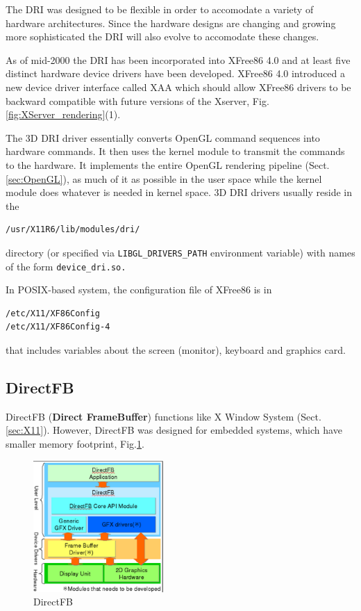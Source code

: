 The DRI was designed to be flexible in order to accomodate a variety of hardware
architectures. Since the hardware designs are changing and growing more
sophisticated the DRI will also evolve to accomodate these changes.

As of mid-2000 the DRI has been incorporated into XFree86 4.0 and at least five
distinct hardware device drivers have been developed. XFree86 4.0 introduced a
new device driver interface called XAA which should allow XFree86 drivers to be
backward compatible with future versions of the Xserver,
Fig.\ref{fig:XServer_rendering}(1).


The 3D DRI driver essentially converts OpenGL command sequences
into hardware commands. It then uses the kernel module to transmit the commands
to the hardware. It implements the entire OpenGL rendering pipeline
(Sect.\ref{sec:OpenGL}), as much of it as possible in the user space
while the kernel module does whatever is needed in kernel space.
3D DRI drivers usually reside in the 
\begin{verbatim}
/usr/X11R6/lib/modules/dri/
\end{verbatim} 
directory (or specified via \verb!LIBGL_DRIVERS_PATH! environment variable) with
names of the form \verb!device_dri.so.!

In POSIX-based system, the configuration file of XFree86 is in
\begin{verbatim}
/etc/X11/XF86Config
/etc/X11/XF86Config-4
\end{verbatim}
that includes variables about the screen (monitor), keyboard and graphics card.
 

\subsection{DirectFB}
\label{sec:DirectFB}

DirectFB ({\bf Direct FrameBuffer}) functions like X Window System
(Sect.\ref{sec:X11}). However, DirectFB was designed for embedded systems, which
have smaller memory footprint, Fig.\ref{fig:DirectFB}.

\begin{figure}[hbt]
  \centerline{\includegraphics[height=5cm,
    angle=0]{./images/DirectFB.eps}}
\caption{DirectFB}
\label{fig:DirectFB}
\end{figure}


